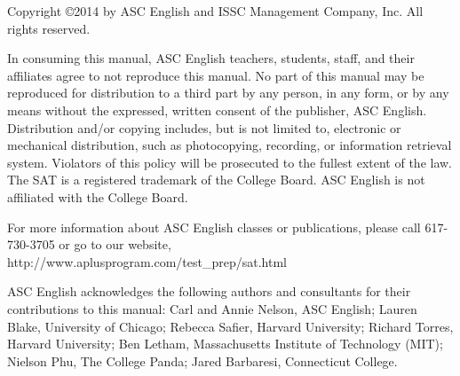 \vspace*{1em}

\vfill
\begingroup
\fontsize{10pt}{12pt}\selectfont
Copyright \copyright 2014 by ASC English and ISSC Management Company, Inc. All rights reserved.

\bigskip
In consuming this manual, ASC English teachers, students, staff, and their affiliates agree to not reproduce this manual. No part of this manual may be reproduced for distribution to a third part by any person, in any form, or by any means without the expressed, written consent of the publisher, ASC English. Distribution and/or copying includes, but is not limited to, electronic or mechanical distribution, such as photocopying, recording, or information retrieval system. Violators of this policy will be prosecuted to the fullest extent of the law.\\
 
\bigskip
The SAT is a registered trademark of the College Board. ASC English is not affiliated with the College Board. 

\bigskip
For more information about ASC English classes or publications, please call 617-730-3705 or go to our website, http:\//\//www.aplusprogram.com\//test\_prep\//sat.html

\bigskip
ASC English acknowledges the following authors and consultants for their contributions to this manual: Carl and Annie Nelson, ASC English; Lauren Blake, University of Chicago; Rebecca Safier, Harvard University; Richard Torres, Harvard University; Ben Letham, Massachusetts Institute of Technology (MIT); Nielson Phu, The College Panda; Jared Barbaresi, Connecticut College.  
\endgroup